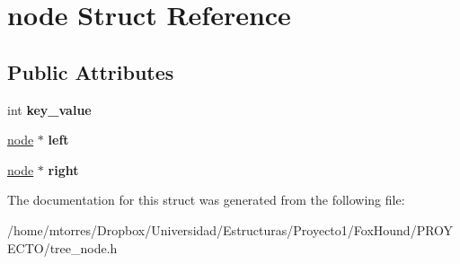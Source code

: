 \hypertarget{structnode}{\section{node Struct Reference}
\label{structnode}
}
\subsection*{Public Attributes}
\begin{DoxyCompactItemize}
\item 
\hypertarget{structnode_a182db137ea0884489bee856c63b33d9a}{int {\bfseries key\-\_\-value}}\label{structnode_a182db137ea0884489bee856c63b33d9a}

\item 
\hypertarget{structnode_a7cbff55ff448f557223f79299056e9b1}{\hyperlink{structnode}{node} $\ast$ {\bfseries left}}\label{structnode_a7cbff55ff448f557223f79299056e9b1}

\item 
\hypertarget{structnode_abdc86d4c8604c481752953af3235fc47}{\hyperlink{structnode}{node} $\ast$ {\bfseries right}}\label{structnode_abdc86d4c8604c481752953af3235fc47}

\end{DoxyCompactItemize}


The documentation for this struct was generated from the following file\-:\begin{DoxyCompactItemize}
\item 
/home/mtorres/\-Dropbox/\-Universidad/\-Estructuras/\-Proyecto1/\-Fox\-Hound/\-P\-R\-O\-Y\-E\-C\-T\-O/tree\-\_\-node.\-h\end{DoxyCompactItemize}
